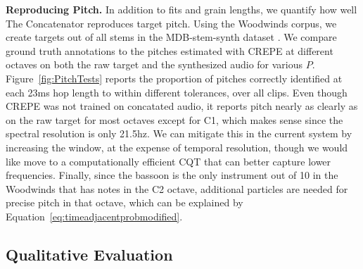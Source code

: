 \documentclass{article}
\begin{document}
\textbf{Reproducing Pitch.} In addition to fits and grain lengths, we quantify how well The Concatenator reproduces target pitch.  Using the Woodwinds corpus, we create targets out of all stems in the MDB-stem-synth dataset \cite{salamon2017analysis}.  We compare ground truth annotations to the pitches estimated with CREPE \cite{kim2018crepe} at different octaves on both the raw target and the synthesized audio for various $P$.  Figure~\ref{fig:PitchTests} reports the proportion of pitches correctly identified at each 23ms hop length to within different tolerances, over all clips.  Even though CREPE was not trained on concatated audio, it reports pitch nearly as clearly as on the raw target for most octaves except for C1, which makes sense since the spectral resolution is only 21.5hz.  We can mitigate this in the current system by increasing the window, at the expense of temporal resolution, though we would like move to a computationally efficient CQT that can better capture lower frequencies.  Finally, since the bassoon is the only instrument out of 10 in the Woodwinds that has notes in the C2 octave, additional particles are needed for precise pitch in that octave, which can be explained by Equation~\ref{eq:timeadjacentprobmodified}.




\subsection{Qualitative Evaluation}
\label{sec:qualitative}
\end{document}
